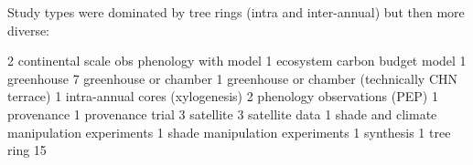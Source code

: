 \documentclass[11pt]{article}
\begin{document}
\newpage
Study types were dominated by tree rings (intra and inter-annual) but then more diverse:
\begin{Schunk}
\begin{Soutput}
                                              2 
     continental scale obs phenology with model 
                                              1 
                  ecosystem carbon budget model 
                                              1 
                                     greenhouse 
                                              7 
                          greenhouse or chamber 
                                              1 
greenhouse or chamber (technically CHN terrace) 
                                              1 
               intra-annual cores (xylogenesis) 
                                              2 
                   phenology observations (PEP) 
                                              1 
                                     provenance 
                                              1 
                               provenance trial 
                                              3 
                                      satellite 
                                              3 
                                 satellite data 
                                              1 
     shade and climate manipulation experiments 
                                              1 
                 shade manipulation experiments 
                                              1 
                                      synthesis 
                                              1 
                                      tree ring 
                                             15 
\end{Soutput}
\end{Schunk}
\newpage
\end{document}
